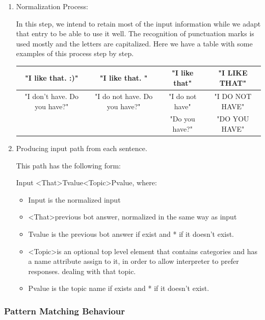 \documentclass[12pt,twoside]{article}
\theoremstyle{plain}
\theoremstyle{definition}
\theoremstyle{remark}
\begin{document}
	\begin{enumerate}
		\item Normalization Process:
		
		In this step, we intend to retain most of the input information while we adapt that entry to be able to use it well. The recognition of punctuation marks is used mostly and the letters are capitalized. Here we have a table with some examples of this process step by step.
		
		\begin{tabular}{|c|c|c|c|}
			\hline
			 "I like that. :)" & "I like that. " & "I like that" & "I LIKE THAT" \\
			\hline
			\scriptsize{"I don't have. Do you have?"}  & \scriptsize{"I do not have. Do you have?"} & \scriptsize{"I do not have"} & \scriptsize{"I DO NOT HAVE"}\\  &  & \scriptsize{"Do you have?"} & \scriptsize{"DO YOU HAVE"}\\
			\hline
		\end{tabular}
		
		\item Producing input path from each sentence.
		
		This path has the following form:
		
		Input \textless That\textgreater Tvalue\textless Topic\textgreater Pvalue,  where:
		
			\begin{itemize}
			
			\item Input is the normalized input
			\item \textless That\textgreater previous bot answer, normalized in the same way as input
			\item Tvalue is the previous bot answer if exist and * if it doesn't exist.
			\item \textless Topic\textgreater is an optional top level element that contains categories and has a name attribute assign to it, in order to allow interpreter to prefer responses.
dealing with that topic.
			\item Pvalue is the topic name if exists and * if it doesn't exist.
			\end{itemize}
	\end{enumerate}
	
\subsubsection{Pattern Matching Behaviour}
	\label{sec:match}
	
\end{document}
